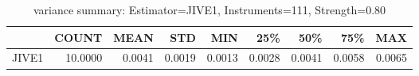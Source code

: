 \begin{table}[ht]
\centering
\caption{variance summary: Estimator=JIVE1, Instruments=111, Strength=0.80}
\begin{tabular}{lrrrrrrrr}
\toprule
 & COUNT & MEAN & STD & MIN & 25\% & 50\% & 75\% & MAX \\
\midrule
JIVE1 & 10.0000 & 0.0041 & 0.0019 & 0.0013 & 0.0028 & 0.0041 & 0.0058 & 0.0065 \\
\bottomrule
\end{tabular}
\end{table}
